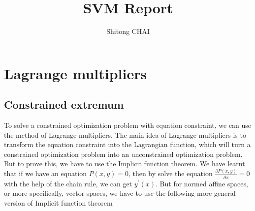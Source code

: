 \documentclass[a4paper,12pt]{report}
\title{SVM Report}
\date{}
\author{Shitong CHAI}
\begin{document}
\maketitle
\tableofcontents

\chapter{Lagrange multipliers}

\section{Constrained extremum}

To solve a constrained optimization problem with equation constraint, we can use the method of Lagrange multipliers. The main idea of Lagrange multipliers is to transform the equation constraint into the Lagrangian function, which will turn a constrained optimization problem into an unconstrained optimization problem. But to prove this, we have to use the Implicit function theorem. We have learnt that if we have an equation $P(x,y)=0$, then by solve the equation $\frac{\partial P(x,y)}{\partial x}=0$
with the help of the chain rule, we can get $y^\prime (x)$. But for normed affine spaces, or more specifically, vector spaces, we have to use the following more general version of Implicit function theorem
\end{document}
